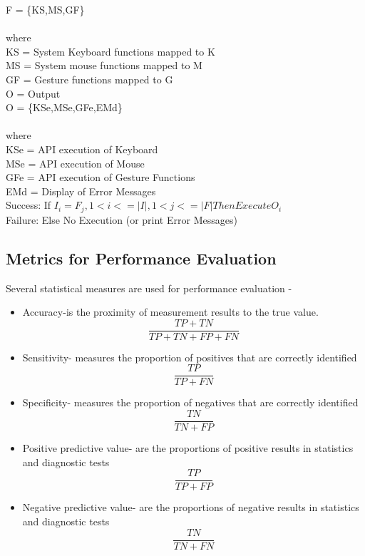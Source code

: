 \documentclass[oneside,a4paper,12pt]{pictreport}
\begin{document}
F = \{KS,MS,GF\}\\\\
where\\
KS = System Keyboard functions mapped to K\\
MS = System mouse functions mapped to M\\
GF = Gesture functions mapped to G\\
O = Output \\
O = \{KSe,MSe,GFe,EMd\}\\\\
where\\
KSe = API execution of Keyboard\\
MSe = API execution of Mouse\\
GFe = API execution of Gesture Functions\\
EMd = Display of Error Messages\\

Success: If $I_{i} = F_{j},1<i<=|I|,1<j<=|F| Then Execute O_{i}$\\
Failure: Else No Execution (or print Error Messages)\\


\subsection{Metrics for Performance Evaluation}
Several statistical measures are used for performance evaluation - 
\begin{itemize}
\item Accuracy-is the proximity of measurement results to the true value.
\begin{equation}
\frac{TP + TN}{TP + TN + FP + FN}
\end{equation}
\item Sensitivity- measures the proportion of positives that are correctly identified
\begin{equation}
\frac{TP}{TP + FN}
\end{equation}
\item Specificity- measures the proportion of negatives that are correctly identified 
\begin{equation}
\frac{TN}{TN + FP}
\end{equation}
\item Positive predictive value- are the proportions of positive results in statistics and diagnostic tests 
\begin{equation}
\frac{TP}{TP + FP}
\end{equation}
\item Negative predictive value- are the proportions of negative results in statistics and diagnostic tests 
\begin{equation}
\frac{TN}{TN + FN}
\end{equation}
\end{itemize}
\end{document}
